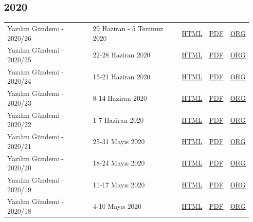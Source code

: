 \documentclass[11pt]{article}
\begin{document}
\subsection*{2020}
\label{sec:org897f53c}
\begin{center}
\begin{tabular}{lllll}
\hline
Yazılım Gündemi - 2020/26 & 29 Haziran - 5 Temmuz 2020 & \href{arsiv/2020/26/yazilim-gundemi-2020-26.html}{HTML} & \href{arsiv/2020/26/yazilim-gundemi-2020-26.pdf}{PDF} & \href{arsiv/2020/26/yazilim-gundemi-2020-26.pdf}{ORG}\\
Yazılım Gündemi - 2020/25 & 22-28 Haziran 2020 & \href{arsiv/2020/25/yazilim-gundemi-2020-25.html}{HTML} & \href{arsiv/2020/25/yazilim-gundemi-2020-25.pdf}{PDF} & \href{arsiv/2020/25/yazilim-gundemi-2020-25.pdf}{ORG}\\
Yazılım Gündemi - 2020/24 & 15-21 Haziran 2020 & \href{arsiv/2020/24/yazilim-gundemi-2020-24.html}{HTML} & \href{arsiv/2020/24/yazilim-gundemi-2020-24.pdf}{PDF} & \href{arsiv/2020/24/yazilim-gundemi-2020-24.pdf}{ORG}\\
Yazılım Gündemi - 2020/23 & 8-14 Haziran 2020 & \href{arsiv/2020/23/yazilim-gundemi-2020-23.html}{HTML} & \href{arsiv/2020/23/yazilim-gundemi-2020-23.pdf}{PDF} & \href{arsiv/2020/23/yazilim-gundemi-2020-23.pdf}{ORG}\\
Yazılım Gündemi - 2020/22 & 1-7 Haziran 2020 & \href{arsiv/2020/22/yazilim-gundemi-2020-22.html}{HTML} & \href{arsiv/2020/22/yazilim-gundemi-2020-22.pdf}{PDF} & \href{arsiv/2020/22/yazilim-gundemi-2020-22.pdf}{ORG}\\
Yazılım Gündemi - 2020/21 & 25-31 Mayıs 2020 & \href{arsiv/2020/21/yazilim-gundemi-2020-21.html}{HTML} & \href{arsiv/2020/21/yazilim-gundemi-2020-21.pdf}{PDF} & \href{arsiv/2020/21/yazilim-gundemi-2020-21.pdf}{ORG}\\
Yazılım Gündemi - 2020/20 & 18-24 Mayıs 2020 & \href{arsiv/2020/20/yazilim-gundemi-2020-20.html}{HTML} & \href{arsiv/2020/20/yazilim-gundemi-2020-20.pdf}{PDF} & \href{arsiv/2020/20/yazilim-gundemi-2020-20.pdf}{ORG}\\
Yazılım Gündemi - 2020/19 & 11-17 Mayıs 2020 & \href{arsiv/2020/19/yazilim-gundemi-2020-19.html}{HTML} & \href{arsiv/2020/19/yazilim-gundemi-2020-19.pdf}{PDF} & \href{arsiv/2020/19/yazilim-gundemi-2020-19.pdf}{ORG}\\
Yazılım Gündemi - 2020/18 & 4-10 Mayıs 2020 & \href{arsiv/2020/18/yazilim-gundemi-2020-18.html}{HTML} & \href{arsiv/2020/18/yazilim-gundemi-2020-18.pdf}{PDF} & \href{arsiv/2020/18/yazilim-gundemi-2020-18.pdf}{ORG}\\

\end{tabular}
\end{center}
\end{document}
